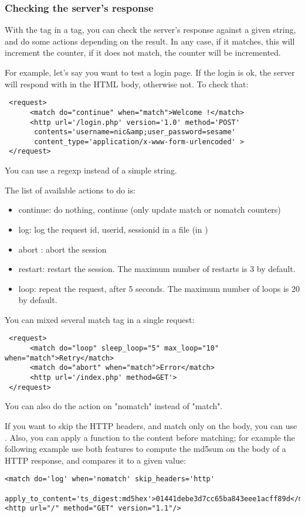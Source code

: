 \documentclass{TSUNG-en}
\begin{document}
\subsubsection{Checking the server's response}


With the tag  in a  tag, you can check
the server's response against a given string, and do some actions
depending on the result. In any case, if it matches, this will
increment the  counter, if it does not match, the
 counter will be incremented.

For example, let's say you want to test a login page. If the login is
ok, the server will respond with  in the
HTML body, otherwise not. To check that:
\begin{Verbatim}
 <request>
      <match do="continue" when="match">Welcome !</match>
      <http url='/login.php' version='1.0' method='POST'
       contents='username=nic&amp;user_password=sesame'
       content_type='application/x-www-form-urlencoded' >
 </request>
\end{Verbatim}

You can use a regexp instead of a simple string.

The list of available actions to do is:
\begin{itemize}
\item continue: do nothing, continue (only update match or nomatch counters)
\item log: log the request id, userid, sessionid in a file (in )
\item abort : abort the session
\item restart: restart the session. The maximum number of
  restarts is 3 by default.
\item loop: repeat the request, after 5 seconds. The maximum number of
  loops is 20 by default.
\end{itemize}

You can mixed several match tag in a single request:
\begin{Verbatim}
 <request>
      <match do="loop" sleep_loop="5" max_loop="10" when="match">Retry</match>
      <match do="abort" when="match">Error</match>
      <http url='/index.php' method=GET'>
 </request>
\end{Verbatim}

You can also do the action on "nomatch" instead of "match".


If you want to skip the HTTP headers, and match only on the body, you
can use . Also, you can apply a
function to the content before matching; for example the following
example use both features to compute the md5sum on the body of a HTTP
response, and compares it to a given value:
\begin{Verbatim}
<match do='log' when='nomatch' skip_headers='http'
  apply_to_content='ts_digest:md5hex'>01441debe3d7cc65ba843eee1acff89d</match>
<http url="/" method="GET" version="1.1"/>
\end{Verbatim}
\end{document}
